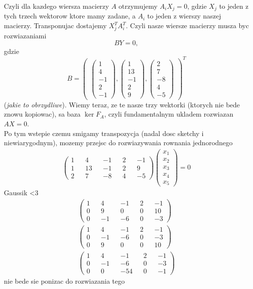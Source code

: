 \documentclass{article}
\begin{document}
Czyli dla kazdego wiersza macierzy $A$ otrzymujemy $A_iX_j=0$, gdzie $X_j$ to jeden z tych trzech wektorow ktore mamy zadane, a $A_i$ to jeden z wierszy naszej macierzy. Transponujac dostajemy $X_j^TA_i^T$. Czyli nasze wiersze macierzy musza byc rozwiazaniami
$$BY=0,$$
gdzie 
$$B=\begin{pmatrix}\begin{pmatrix}
    1\\4\\-1\\2\\-1
\end{pmatrix},\begin{pmatrix}
    1\\13\\-1\\2\\9
\end{pmatrix},\begin{pmatrix}
    2\\7\\-8\\4\\-5
\end{pmatrix}\end{pmatrix}^T$$ 
(\emph{jakie to obrzydliwe}). Wiemy teraz, ze te nasze trzy wektorki (ktorych nie bede znowu kopiowac), sa baza $\ker F_A$, czyli fundamentalnym ukladem rozwiazan $AX=0$.\medskip\\
Po tym wstepie czemu smigamy transpozycja (nadal dosc sketchy i niewiarygodnym), mozemy przejsc do rozwiazywania rownania jednorodnego
\begin{align*}
    \begin{pmatrix}
        1&&4&&-1&&2&&-1\\
        1&&13&&-1&&2&&9\\
        2&&7&&-8&&4&&-5
    \end{pmatrix}
    \begin{pmatrix}
        x_1\\x_2\\x_3\\x_4\\x_5
    \end{pmatrix}=0
\end{align*}
Gaussik <3
\begin{align*}
    \begin{pmatrix}
        1&&4&&-1&&2&&-1\\
        0&&9&&0&&0&&10\\
        0&&-1&&-6&&0&&-3
    \end{pmatrix}\\
    \begin{pmatrix}
        1&&4&&-1&&2&&-1\\
        0&&-1&&-6&&0&&-3\\
        0&&9&&0&&0&&10
    \end{pmatrix}\\
    \begin{pmatrix}
        1&&4&&-1&&2&&-1\\
        0&&-1&&-6&&0&&-3\\
        0&&0&&-54&&0&&-1
    \end{pmatrix}
\end{align*}
nie bede sie ponizac do rozwiazania tego\bigskip\\
\end{document}
